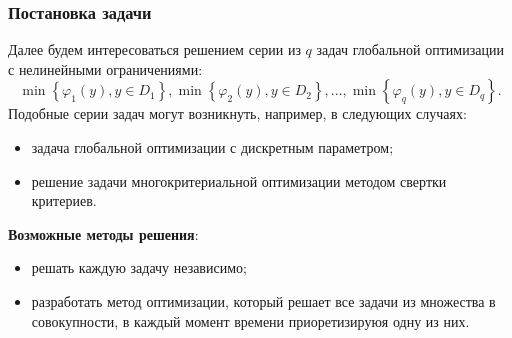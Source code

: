 \documentclass[aspectratio=1610]{beamer}
\begin{document}
\begin{frame}
  \frametitle{Постановка задачи}
  Далее будем интересоваться решением серии из \(q\) задач глобальной оптимизации с нелинейными ограничениями:
  \begin{displaymath}
    \min\left\{\varphi_1(y), y\in D_1 \right\}, \min\left\{\varphi_2(y), y\in D_2\right\},..., \min\left\{\varphi_q(y), y\in D_q\right\}.
  \end{displaymath}
  Подобные серии задач могут возникнуть, например, в следующих случаях:
  \begin{itemize}
    \item задача глобальной оптимизации с дискретным параметром;
    \item  решение задачи многокритериальной оптимизации методом свертки критериев.
  \end{itemize}
\textbf{Возможные методы решения}:
  \begin{itemize}
    \item решать каждую задачу независимо;
    \item разработать метод оптимизации, который решает все задачи из множества в совокупности, в каждый
    момент времени приоретизируюя одну из них.
  \end{itemize}
\end{frame}
\end{document}
